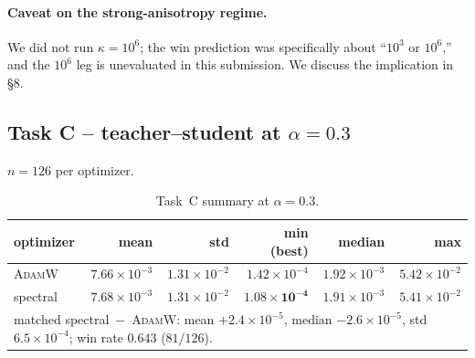 \documentclass{article}
\newcommand{\Adamw}{\textsc{AdamW}}
\begin{document}
\paragraph{Caveat on the strong-anisotropy regime.}
We did not run $\kappa=10^6$; the win prediction was specifically
about ``$10^3$ or $10^6$,'' and the $10^6$ leg is unevaluated in
this submission.  We discuss the implication in §8.

\subsection{Task C -- teacher--student at $\alpha = 0.3$}
$n=126$ per optimizer.

\begin{table}[h]
\centering
\caption{Task~C summary at $\alpha=0.3$.}
\label{tab:task_c}
\begin{tabular}{l r r r r r}
\toprule
optimizer & mean & std & min (best) & median & max\\
\midrule
\Adamw\     & $7.66\!\times\!10^{-3}$ & $1.31\!\times\!10^{-2}$ & $1.42\!\times\!10^{-4}$ & $1.92\!\times\!10^{-3}$ & $5.42\!\times\!10^{-2}$\\
spectral    & $7.68\!\times\!10^{-3}$ & $1.31\!\times\!10^{-2}$ & $\mathbf{1.08\!\times\!10^{-4}}$ & $1.91\!\times\!10^{-3}$ & $5.41\!\times\!10^{-2}$\\
\midrule
\multicolumn{6}{l}{matched spectral~$-$~\Adamw: mean $+2.4\!\times\!10^{-5}$,
median $-2.6\!\times\!10^{-5}$, std $6.5\!\times\!10^{-4}$;
win rate $\mathbf{0.643}$ ($81/126$).}\\
\bottomrule
\end{tabular}
\end{table}
\end{document}
